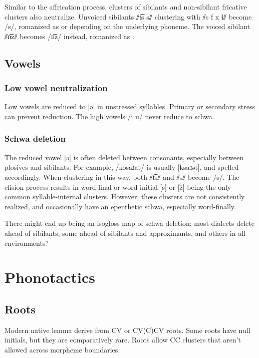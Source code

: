 Similar to the affrication process, clusters of sibilants and non-sibilant fricative clusters also neutralize. Unvoiced sibilants ⫽t͡s s⫽ clustering with ⫽s f x ɬ⫽ become /s/, romanized as  or  depending on the underlying phoneme. The voiced sibilant ⫽n͡z⫽ becomes /n͡z/ instead, romanized as .

\section{Vowels}
\subsection{Low vowel neutralization} \label{sub:schwa_neutral}
Low vowels are reduced to [ə] in unstressed syllables. Primary or secondary stress can prevent reduction. The high vowels /i u/ never reduce to schwa.

\subsection{Schwa deletion} \label{sub:schwa_delete}
The reduced vowel [ə] is often deleted between consonants, especially between plosives and sibilants. For example,  /kosaɹat/ is usually [ksaɹət], and spelled accordingly. When clustering in this way, both ⫽t͡s⫽ and ⫽s⫽ become /s/. The elision process results in word-final or word-initial [s] or [z̃] being the only common syllable-internal clusters. However, these clusters are not consistently realized, and occasionally have an epenthetic schwa, especially word-finally. 

\begin{kaobox}[frametitle=\sc todo:] 
There might end up being an isogloss map of schwa deletion: most dialects delete ahead of sibilants, some ahead of sibilants and approximants, and others in all environments?
\end{kaobox}

\setchapterpreamble[u]{\margintoc}
\chapter{Phonotactics}
\section{Roots}
Modern native lemma derive from CV or CV(C)CV roots. Some roots have null initials, but they are comparatively rare. Roots allow CC clusters that aren't allowed across morpheme boundaries.

